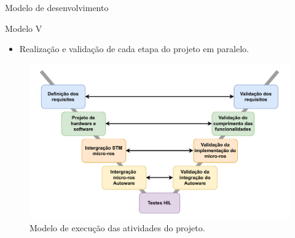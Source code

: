 \documentclass{if-beamer}
\begin{document}
\begin{frame}{Modelo de desenvolvimento}
	
	
	\begin{block}{Modelo V}
		
		\begin{itemize}
			\item Realização e validação de cada etapa do projeto em paralelo.
			
		\end{itemize}
		
	\end{block}
	
	
	\begin{figure}
		\centering
		\includegraphics[width=0.8\linewidth]{img/modelo-v}
		\caption{Modelo de execução das atividades do projeto.}
		\label{fig:modelo-v}
	\end{figure}

	
\end{frame}
\end{document}
